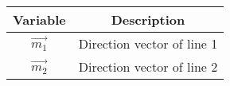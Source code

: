 \begin{center}
    \begin{tabular}{|c|c|} 
        \hline
            \textbf{Variable} & \textbf{Description} \\ 
        \hline
	    $\vec{m_1}$ & Direction vector of line 1\\
        \hline
        $\vec{m_2}$ & Direction vector of line 2\\
                \hline
    \end{tabular}
\end{center}

